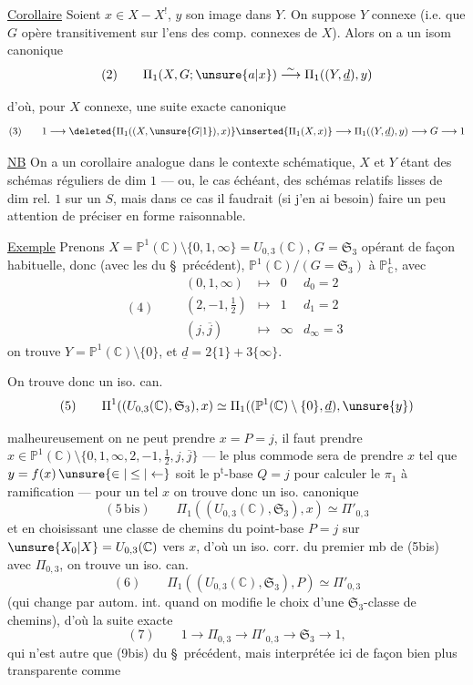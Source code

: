 \uline{Corollaire} Soient $x\in X-X^{!}$, $y$ son image dans $Y$. On suppose $Y$ connexe (i.e. que $G$ opère transitivement sur l'ens des comp. connexes de $X$). Alors on a un isom canonique
\[
(2)\qquad \Pi_1(X,G;\unsure{a|x})\overset{\sim}{\longrightarrow}\Pi_1((Y,\underline d),y)
\]

d'où, pour $X$ connexe, une suite exacte canonique
\[
(3)\qquad
1\longrightarrow
\deleted{\Pi_1((X,\unsure{G|1}),x)}\inserted{\Pi_1(X,x)}
\longrightarrow\Pi_1((Y,\underline d),y)\longrightarrow G\longrightarrow 1
\]

\uline{NB} On a  un corollaire analogue dans le contexte schématique, $X$ et $Y$ étant des schémas réguliers de dim $1$ --- ou, le cas échéant, des schémas relatifs lisses de dim rel. $1$ sur un $S$, mais dans ce cas il faudrait (si j'en ai besoin) faire un peu attention de préciser  en forme raisonnable.

\uline{Exemple} Prenons $X=\mathbb P^1(\mathbb C)\setminus\{0,1,\infty\}=U_{0,3}(\mathbb C)$,
$G=\mathfrak S_3$ opérant de façon habituelle, donc (avec les   du \S\ précédent),
 $\mathbb P^1(\mathbb C)/(G=\mathfrak S_3)$ à $\mathbb P^1_{\mathbb C}$, avec
\[
(4)\qquad
\begin{array}{rcll}
(0,1,\infty)&\longmapsto&0&d_0=2\\
(2,-1,\tfrac12)&\longmapsto&1&d_1=2\\
(j,\overline j)&\longmapsto&\infty&d_\infty=3
\end{array}
\]
on trouve $Y=\mathbb P^1(\mathbb C)\setminus\{0\}$, et $\underline d=2\{1\}+3\{\infty\}$.

On trouve donc un iso. can.
\[
(5)\qquad
\Pi^{1}((U_{0,3}(\mathbb C),\mathfrak S_3),x)
\simeq\Pi_1((\mathbb P^1(\mathbb C)\setminus\{0\},\underline d),\unsure{y})
\]

 malheureusement on ne peut prendre $x=P=j$, il faut prendre
$x\in\mathbb P^1(\mathbb C)\setminus\{0,1,\infty,2,-1,\tfrac12,j,\overline j\}$
--- le plus commode sera de prendre $x$ tel que $y=f(x)\,\unsure{\in|\leq|\leftarrow}$ soit le $\mathrm p^{\mathrm t}$-base  $Q=j$ pour calculer le $\pi_1$ à ramification --- pour un tel $x$ on trouve donc un iso. canonique
\[
(5\,\mathrm{bis})\qquad
\Pi_1((U_{0,3}(\mathbb C),\mathfrak S_3),x)\simeq\Pi'_{0,3}
\]
et en choisissant une classe de chemins du point-base  $P=j$ sur $\unsure{X_0|X}=U_{0,3}(\mathbb C)$ vers $x$, d'où un iso. corr. du premier mb de (5bis)  avec $\Pi_{0,3}$, on trouve un iso. can.
\[
(6)\qquad
\Pi_1((U_{0,3}(\mathbb C),\mathfrak S_3),P)\simeq\Pi'_{0,3}
\]
(qui change par autom. int. quand on modifie le choix d'une $\mathfrak S_3$-classe de chemins), d'où la suite exacte
\[
(7)\qquad
1\longrightarrow\Pi_{0,3}\longrightarrow\Pi'_{0,3}\longrightarrow\mathfrak S_3\longrightarrow 1,
\]
qui n'est autre que (9bis) du \S\ précédent, mais interprétée ici de façon bien plus transparente comme

